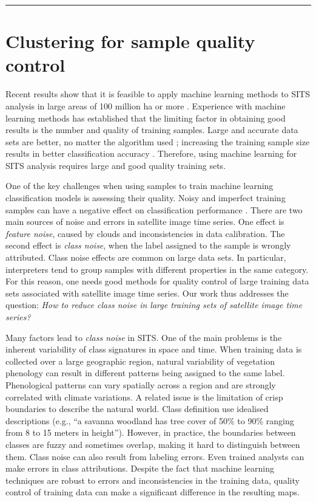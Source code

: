 \documentclass[a4paper,]{tufte-book}
\begin{document}
\begin{center}\rule{0.5\linewidth}{0.5pt}\end{center}

\hypertarget{clustering-for-sample-quality-control}{%
\section{Clustering for sample quality control}\label{clustering-for-sample-quality-control}}

Recent results show that it is feasible to apply machine learning methods to SITS analysis in large areas of 100 million ha or more \citep{Picoli2018, Simoes2020, Parente2019a, Griffiths2019a}. Experience with machine learning methods has established that the limiting factor in obtaining good results is the number and quality of training samples. Large and accurate data sets are better, no matter the algorithm used \citep{Maxwell2018}; increasing the training sample size results in better classification accuracy \citep{ThanhNoi2018}. Therefore, using machine learning for SITS analysis requires large and good quality training sets.

One of the key challenges when using samples to train machine learning classification models is assessing their quality. Noisy and imperfect training samples can have a negative effect on classification performance \citep{Frenay2014}. There are two main sources of noise and errors in satellite image time series. One effect is \emph{feature noise}, caused by clouds and inconsistencies in data calibration. The second effect is \emph{class noise}, when the label assigned to the sample is wrongly attributed. Class noise effects are common on large data sets. In particular, interpreters tend to group samples with different properties in the same category. For this reason, one needs good methods for quality control of large training data sets associated with satellite image time series. Our work thus addresses the question: \emph{How to reduce class noise in large training sets of satellite image time series?}

Many factors lead to \emph{class noise} in SITS. One of the main problems is the inherent variability of class signatures in space and time. When training data is collected over a large geographic region, natural variability of vegetation phenology can result in different patterns being assigned to the same label. Phenological patterns can vary spatially across a region and are strongly correlated with climate variations. A related issue is the limitation of crisp boundaries to describe the natural world. Class definition use idealised descriptions (e.g., ``a savanna woodland has tree cover of 50\% to 90\% ranging from 8 to 15 meters in height''). However, in practice, the boundaries between classes are fuzzy and sometimes overlap, making it hard to distinguish between them. Class noise can also result from labeling errors. Even trained analysts can make errors in class attributions. Despite the fact that machine learning techniques are robust to errors and inconsistencies in the training data, quality control of training data can make a significant difference in the resulting maps.
\end{document}
